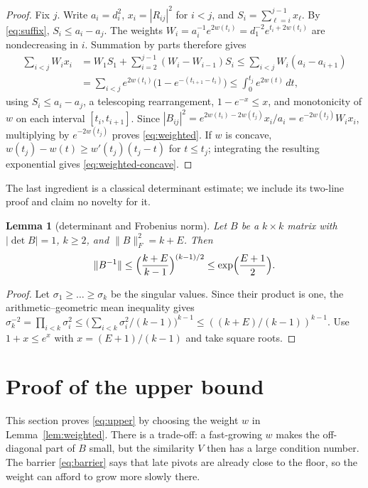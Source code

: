 \documentclass[11pt,a4paper]{article}
\newtheorem{lemma}[theorem]{Lemma}
\theoremstyle{definition}
\numberwithin{equation}{section}
\begin{document}
\begin{proof}
Fix $j$. Write $a_i=d_i^2$, $x_i=|R_{ij}|^2$ for $i<j$, and $S_i=\sum_{\ell=i}^{j-1}x_\ell$. By \eqref{eq:suffix},
$S_i\le a_i-a_j$. The weights $W_i=a_i^{-1}e^{2w(t_i)}=d_1^{-2}e^{t_i+2w(t_i)}$ are nondecreasing in $i$. Summation
by parts therefore gives
\[
\begin{aligned}
 \sum_{i<j}W_ix_i&=W_1S_1+\sum_{i=2}^{j-1}(W_i-W_{i-1})S_i
 \le\sum_{i<j}W_i(a_i-a_{i+1})\\
 &=\sum_{i<j}e^{2w(t_i)}\bigl(1-e^{-(t_{i+1}-t_i)}\bigr)
 \le\int_0^{t_j}e^{2w(t)}\,dt,
\end{aligned}
\]
using $S_i\le a_i-a_j$, a telescoping rearrangement, $1-e^{-x}\le x$, and monotonicity of $w$ on each interval
$[t_i,t_{i+1}]$. Since $|B_{ij}|^2=e^{2w(t_i)-2w(t_j)}x_i/a_i=e^{-2w(t_j)}W_ix_i$, multiplying by $e^{-2w(t_j)}$ proves
\eqref{eq:weighted}. If $w$ is concave, $w(t_j)-w(t)\ge w'(t_j)(t_j-t)$ for $t\le t_j$; integrating the resulting
exponential gives \eqref{eq:weighted-concave}.
\end{proof}

The last ingredient is a classical determinant estimate; we include its two-line proof and claim no novelty for it.

\begin{lemma}[determinant and Frobenius norm]\label{lem:det}
Let $B$ be a $k\times k$ matrix with $|\det B|=1$, $k\ge2$, and $\|B\|_F^2=k+E$. Then
\begin{equation}\label{eq:det}
 \|B^{-1}\|\le\Bigl(\frac{k+E}{k-1}\Bigr)^{(k-1)/2}\le\exp\Bigl(\frac{E+1}2\Bigr).
\end{equation}
\end{lemma}

\begin{proof}
Let $\sigma_1\ge\dots\ge\sigma_k$ be the singular values. Since their product is one, the arithmetic--geometric mean
inequality gives $\sigma_k^{-2}=\prod_{i<k}\sigma_i^2\le\bigl(\sum_{i<k}\sigma_i^2/(k-1)\bigr)^{k-1}\le((k+E)/(k-1))^{k-1}$.
Use $1+x\le e^x$ with $x=(E+1)/(k-1)$ and take square roots.
\end{proof}

\section{Proof of the upper bound}\label{sec:upper}

This section proves \eqref{eq:upper} by choosing the weight $w$ in Lemma~\ref{lem:weighted}. There is a trade-off:
a fast-growing $w$ makes the off-diagonal part of $B$ small, but the similarity $V$ then has a large condition
number. The barrier \eqref{eq:barrier} says that late pivots are already close to the floor, so the weight can
afford to grow more slowly there.
\end{document}
